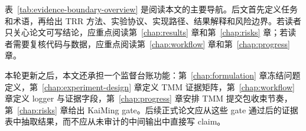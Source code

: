 \begin{table}[H]
	\centering
	\caption{本文证据层级与允许使用方式。}
	\label{tab:evidence-boundary-overview}
	\small
	\end{table}

表~\ref{tab:evidence-boundary-overview} 是阅读本文的主要导航。后文首先定义任务和术语，再给出 TRR 方法、实验协议、实现路径、结果解释和风险边界。若读者只关心论文可写结论，应重点阅读第~\ref{chap:results} 章和第~\ref{chap:risks} 章；若读者需要复核代码与数据，应重点阅读第~\ref{chap:workflow} 章和第~\ref{chap:progress} 章。

本轮更新之后，本文还承担一个监督台账功能：第~\ref{chap:formulation} 章冻结问题定义，第~\ref{chap:experiment-design} 章定义 TMM 证据矩阵，第~\ref{chap:workflow} 章定义 logger 与证据字段，第~\ref{chap:progress} 章安排 TMM 提交包收束节奏，第~\ref{chap:risks} 章给出 KaiMing gate。后续正式论文应从这些 gate 通过后的证据表中抽取结果，而不应从未审计的中间输出中直接写 claim。
